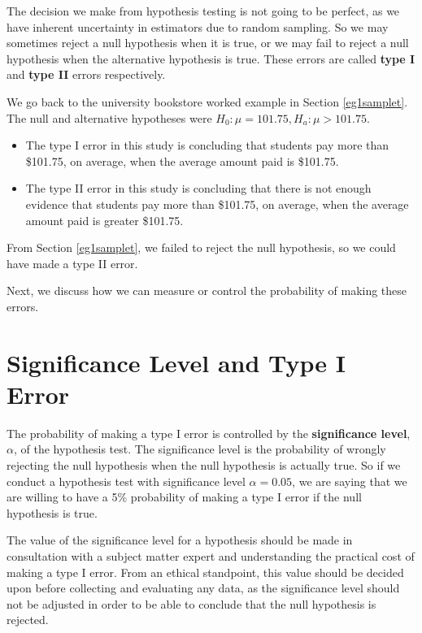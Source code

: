 \documentclass[
]{book}
\theoremstyle{definition}
\theoremstyle{definition}
\theoremstyle{definition}
\theoremstyle{definition}
\theoremstyle{remark}
\begin{document}
The decision we make from hypothesis testing is not going to be perfect, as we have inherent uncertainty in estimators due to random sampling. So we may sometimes reject a null hypothesis when it is true, or we may fail to reject a null hypothesis when the alternative hypothesis is true. These errors are called \textbf{type I} and \textbf{type II} errors respectively.

We go back to the university bookstore worked example in Section \ref{eg1samplet}. The null and alternative hypotheses were \(H_0: \mu = 101.75, H_a: \mu > 101.75\).

\begin{itemize}
\item
  The type I error in this study is concluding that students pay more than \$101.75, on average, when the average amount paid is \$101.75.
\item
  The type II error in this study is concluding that there is not enough evidence that students pay more than \$101.75, on average, when the average amount paid is greater \$101.75.
\end{itemize}

From Section \ref{eg1samplet}, we failed to reject the null hypothesis, so we could have made a type II error.

Next, we discuss how we can measure or control the probability of making these errors.

\hypertarget{significance-level-and-type-i-error}{%
\section{Significance Level and Type I Error}\label{significance-level-and-type-i-error}}

The probability of making a type I error is controlled by the \textbf{significance level}, \(\alpha\), of the hypothesis test. The significance level is the probability of wrongly rejecting the null hypothesis when the null hypothesis is actually true. So if we conduct a hypothesis test with significance level \(\alpha = 0.05\), we are saying that we are willing to have a 5\% probability of making a type I error if the null hypothesis is true.

The value of the significance level for a hypothesis should be made in consultation with a subject matter expert and understanding the practical cost of making a type I error. From an ethical standpoint, this value should be decided upon before collecting and evaluating any data, as the significance level should not be adjusted in order to be able to conclude that the null hypothesis is rejected.
\end{document}
